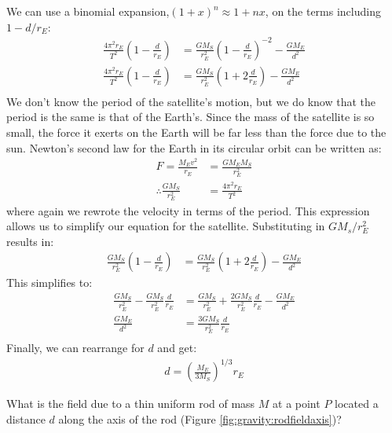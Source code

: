 \begin{solution}
\begin{parts}
We can use a binomial expansion,$(1+x)^n\approx 1+nx$,  on the terms including $1-d/r_E$:
\begin{align*}
\frac{4\pi^2r_E}{T^2}\left(1-\frac{d}{r_E}\right)&=\frac{GM_S}{r_E^2}\left(1-\frac{d}{r_E}\right)^{-2}-\frac{GM_E}{d^2}\\
\frac{4\pi^2r_E}{T^2}\left(1-\frac{d}{r_E}\right)&=\frac{GM_S}{r_E^2}\left(1+2\frac{d}{r_E}\right)-\frac{GM_E}{d^2}\\
\end{align*}
We don't know the period of the satellite's motion, but we do know that the period is the same is that of the Earth's. Since the mass of the satellite is so small, the force it exerts on the Earth will be far less than the force due to the sun. Newton's second law for the Earth in its circular orbit can be written as:
\begin{align*}
F=\frac{M_Ev^2}{r_E}&=\frac{GM_EM_S}{r_E^2}\\
\therefore \frac{GM_S}{r_E^2}&=\frac{4\pi^2r_E}{T^2}
\end{align*}
where again we rewrote the velocity in terms of the period. This expression allows us to simplify our equation for the satellite. Substituting in $GM_s/r_E^2$ results in:
\begin{align*}
\frac{GM_S}{r_E^2}\left(1-\frac{d}{r_E}\right)&=\frac{GM_S}{r_E^2}\left(1+2\frac{d}{r_E}\right)-\frac{GM_E}{d^2}
\end{align*}
This simplifies to:
\begin{align*}
\frac{GM_S}{r_E^2}-\frac{GM_S}{r_E^2}\frac{d}{r_E}&=\frac{GM_S}{r_E^2}+\frac{2GM_S}{r_E^2}\frac{d}{r_E}-\frac{GM_E}{d^2}\\
\frac{GM_E}{d^2}&=\frac{3GM_S}{r_E^2}\frac{d}{r_E}\\
\end{align*}
Finally, we can rearrange for $d$ and get:
\begin{align*}
d=\left(\frac{M_E}{3M_S}\right)^{1/3}r_E
\end{align*}
\end{parts}
\end{solution}

\question What is the field due to a thin uniform rod of mass $M$ at a point $P$ located a distance $d$ along the axis of the rod (Figure \ref{fig:gravity:rodfieldaxis})?

